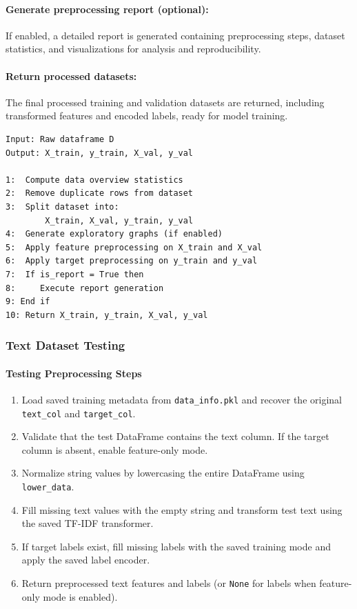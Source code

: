 \paragraph{Generate preprocessing report (optional):}\par
If enabled, a detailed report is generated containing preprocessing steps, dataset statistics, and visualizations for analysis and reproducibility.
\vspace{1cm}
\paragraph{Return processed datasets:}\par
The final processed training and validation datasets are returned, including transformed features and encoded labels, ready for model training.
\vspace{2cm}
\begin{lstlisting}[style=algostyle,caption={Common Preprocessing Pipeline},label={alg:common_preprocessing}]
Input: Raw dataframe D
Output: X_train, y_train, X_val, y_val

1:  Compute data overview statistics
2:  Remove duplicate rows from dataset
3:  Split dataset into:
        X_train, X_val, y_train, y_val
4:  Generate exploratory graphs (if enabled)
5:  Apply feature preprocessing on X_train and X_val
6:  Apply target preprocessing on y_train and y_val
7:  If is_report = True then
8:     Execute report generation
9: End if
10: Return X_train, y_train, X_val, y_val
\end{lstlisting}
\subsubsection{Text Dataset Testing}

\vspace{1cm}
\paragraph{Testing Preprocessing Steps}\par

\begin{enumerate}
  \item Load saved training metadata from \texttt{data\_info.pkl} and recover the original \texttt{text\_col} and \texttt{target\_col}.
  \item Validate that the test DataFrame contains the text column. If the target column is absent, enable feature-only mode.
  \item Normalize string values by lowercasing the entire DataFrame using \texttt{lower\_data}. 
  \item Fill missing text values with the empty string and transform test text using the saved TF-IDF transformer.
  \item If target labels exist, fill missing labels with the saved training mode and apply the saved label encoder.
  \item Return preprocessed text features and labels (or \texttt{None} for labels when feature-only mode is enabled).
\end{enumerate}
\vspace{1cm}
